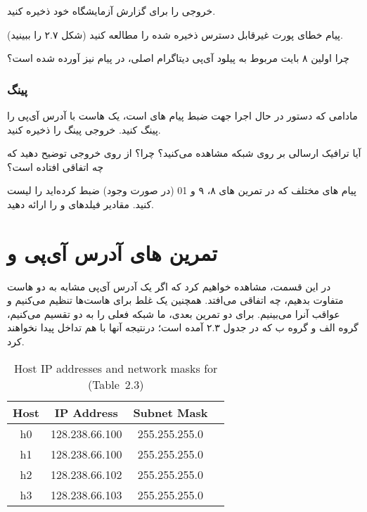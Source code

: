 \documentclass{../UTNetLabFa}
\begin{document}

خروجی  را برای گزارش آزمایشگاه خود ذخیره کنید.
	\begin{report}
	\item
		پیام خطای پورت غیرقابل دسترس  ذخیره شده را مطالعه کنید (شکل ۲.۷ را ببینید).
	\item
		چرا اولین ۸ بایت مربوط به پیلود آی‌پی دیتاگرام اصلی، در پیام  نیز آورده شده است؟
	\end{report}
 

	\section {پینگ \textLR{ICMP}}
	
	مادامی که دستور  در حال اجرا جهت ضبط پیام های  است، یک هاست با آدرس آی‌پی  را پینگ کنید. خروجی پینگ را ذخیره کنید.
		\begin{report}
		\item
		آیا ترافیک ارسالی بر روی شبکه مشاهده می‌کنید؟ چرا؟ از روی خروجی  توضیح دهید که چه اتفاقی افتاده است؟
		\item
			پیام های مختلف  که در تمرین های ۸، ۹ و 01 (در صورت وجود) ضبط کرده‌اید را لیست کنید. مقادیر فیلدهای  و  را ارائه دهید.
		\end{report}
	
\part{تمرین های آدرس آی‌پی و }
	
	در این قسمت، مشاهده خواهیم کرد که اگر یک آدرس آی‌پی مشابه به دو هاست متفاوت بدهیم، چه اتفاقی می‌افتد. همچنین یک  غلط برای هاست‌ها تنظیم می‌کنیم و عواقب آنرا می‌بینیم. برای دو تمرین بعدی، ما شبکه  فعلی را به دو  تقسیم می‌کنیم، گروه الف و گروه ب که در جدول ۲.۳ آمده است؛ درنتیجه آنها با هم تداخل پیدا نخواهند کرد.
	
	{
		\begin{table}[H]
			\caption{Host IP addresses and network masks for %
			(Table~2.3)}
			\label{tab:2.3}
			\centering
			\begin{tabular}{ c c c c }
				\hline \hline
				Host & IP Address & Subnet Mask \\
				\hline 
				h0 & 128.238.66.100 & 255.255.255.0 \\
				h1 & 128.238.66.100 & 255.255.255.0 \\
				h2 & 128.238.66.102 & 255.255.255.0 \\
				h3 & 128.238.66.103 & 255.255.255.0 \\
				\hline \hline
				\end{tabular}
		\end{table}
	}
\end{document}
